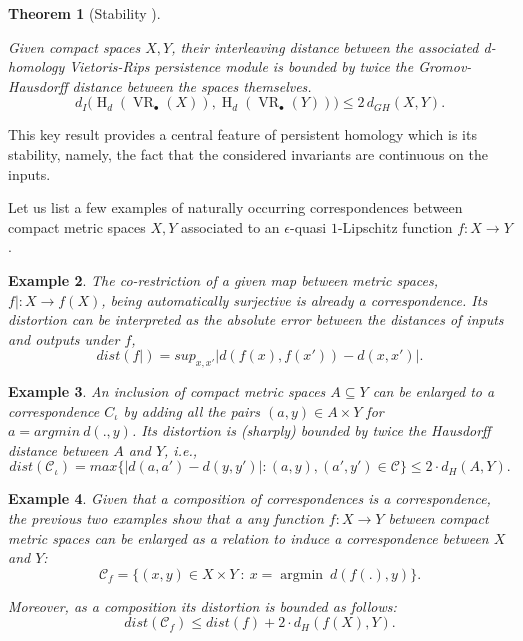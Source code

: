 \documentclass[11pt]{article}
\newtheorem{thm}{Theorem}[section]
\newtheorem{ex}[thm]{Example}
\DeclareMathOperator{\VR}{VR}
\renewcommand{\H}{\operatorname{H}}
\newcommand{\bu}{_{\bullet}}
\newcommand{\C}{\mathcal{C}}
\newcommand{\argmin}{\operatorname{argmin}}
\begin{document}
\begin{thm}[Stability \cite{cohen2005stability}]  \label{thm GH stability}

Given compact spaces $X, Y$, their interleaving distance between the associated d-homology Vietoris-Rips persistence module is bounded by twice the Gromov-Hausdorff distance between the spaces themselves.
\[ d_I \big( \H_d(\VR\bu(X)), \H_d(\VR\bu(Y)) \big) \leq 2\,d_{GH}(X,Y). \]    
\end{thm}
This key result provides a central feature of persistent homology which is its stability, namely, the fact that the considered invariants are continuous on the inputs.


Let us list a few examples of naturally occurring correspondences between compact metric spaces $X,Y$ associated to an $\epsilon$-quasi $1$-Lipschitz function $f:X\to Y$.

\begin{ex}\label{example correspondences 1}
The co-restriction of a given map between metric spaces, $f|:X\to f(X)$, being automatically surjective is already a correspondence. Its distortion can be interpreted as the absolute error between the distances of inputs and outputs under $f$,  
    \[dist(f|)=sup_{x,x'}\big| d(f(x),f(x')) - d(x,x') \big| .\]
\end{ex}
 
\begin{ex}\label{example correspondences 2}
An inclusion of compact metric spaces $A\subseteq Y$ can be enlarged to a correspondence $C_{\iota}$ by adding all the pairs $(a,y)\in A\times Y$ for $a = argmin~ d(.,y)$. Its distortion is (sharply) bounded by twice the Hausdorff distance between $A$ and $Y$, i.e., 
\[dist(\C_{\iota})= max\big\{|d(a,a') - d(y,y')| : (a,y),(a',y') \in \C \big\}\leq 2\cdot d_{H}(A,Y).\]  
\end{ex}

\begin{ex}\label{example correspondences after function}
Given that a composition of correspondences is a correspondence, the previous two examples show that a any function $f:X\to Y$ between compact metric spaces can be enlarged as a relation to induce a correspondence between $X$ and $Y$:
\[\C_f=\{(x,y) \in X\times Y~:~ x=\argmin~d(f(.),y) \}.\]

Moreover, as a composition its distortion is bounded as follows:
\[ dist(\C_f) \leq dist(f)+2 \cdot d_{H}(f(X),Y).\]
\end{ex}

\medskip
\end{document}
